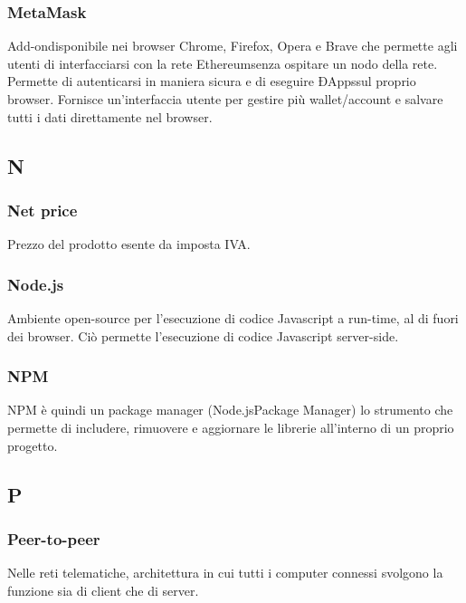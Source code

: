 \subsubsection*{MetaMask}
Add-on\glosp disponibile nei browser Chrome, Firefox, Opera e Brave che permette agli utenti di interfacciarsi con la rete Ethereum\glosp senza ospitare un nodo della rete. Permette di autenticarsi in maniera sicura e di eseguire ÐApps\glosp sul proprio browser. Fornisce un'interfaccia utente per gestire più wallet/account e salvare tutti i dati direttamente nel browser. 

\subsection*{N}

\subsubsection*{Net price}
Prezzo del prodotto esente da imposta IVA.


\subsubsection*{Node.js}
Ambiente open-source per l'esecuzione di codice Javascript a run-time, al di fuori dei browser. Ciò permette l'esecuzione di codice Javascript server-side.

\subsubsection*{NPM}
NPM è quindi un package manager (Node.js\glosp Package Manager) lo strumento che permette di includere, rimuovere e aggiornare le librerie all'interno di un proprio progetto.


\subsection*{P}


\subsubsection*{Peer-to-peer}
Nelle reti telematiche, architettura in cui tutti i computer connessi svolgono la funzione sia di client che di server.

